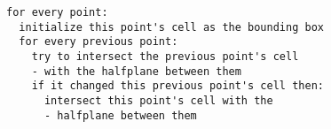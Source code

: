 \begin{verbatim}
for every point:
  initialize this point's cell as the bounding box
  for every previous point:
    try to intersect the previous point's cell 
    - with the halfplane between them
    if it changed this previous point's cell then:
      intersect this point's cell with the 
      - halfplane between them
\end{verbatim}